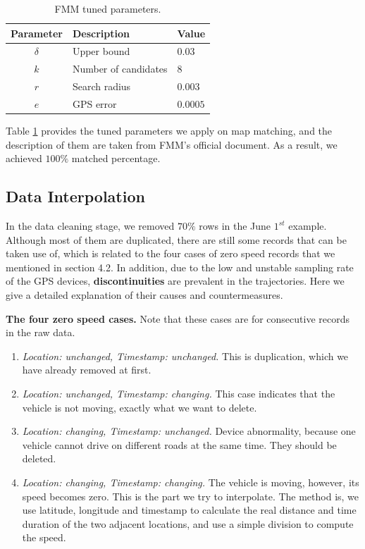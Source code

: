 \begin{table}[htb]
  \begin{center}
      \caption{FMM tuned parameters.}
      \label{fmm_table}
      \begin{tabular}{cll}
          \toprule

          \textbf{Parameter} & \textbf{Description} & \textbf{Value}\\

          \midrule

          $\delta$ & Upper bound & $0.03$\\
          $k$ & Number of candidates & $8$\\
          $r$ & Search radius & $0.003$\\
          $e$ & GPS error & $0.0005$\\

          \bottomrule
      \end{tabular}
  \end{center}
\end{table}

Table \ref{fmm_table} provides the tuned parameters we apply on map matching, and the description of them are taken from FMM's official document. As a result, we achieved $100\%$ matched percentage.

\subsection{Data Interpolation}
In the data cleaning stage, we removed $70\%$ rows in the June $1^{st}$ example. Although most of them are duplicated, there are still some records that can be taken use of, which is related to the four cases of zero speed records that we mentioned in section 4.2. In addition, due to the low and unstable sampling rate of the GPS devices, \textbf{discontinuities} are prevalent in the trajectories. Here we give a detailed explanation of their causes and countermeasures.

\vspace{\baselineskip}

\textbf{The four zero speed cases.} Note that these cases are for consecutive records in the raw data.
\begin{enumerate}
  \item \textit{Location: unchanged, Timestamp: unchanged.} This is duplication, which we have already removed at first.
  \item \textit{Location: unchanged, Timestamp: changing.} This case indicates that the vehicle is not moving, exactly what we want to delete.
  \item \textit{Location: changing, Timestamp: unchanged.} Device abnormality, because one vehicle cannot drive on different roads at the same time. They should be deleted.
  \item \textit{Location: changing, Timestamp: changing.} The vehicle is moving, however, its speed becomes zero. This is the part we try to interpolate. The method is, we use latitude, longitude and timestamp to calculate the real distance and time duration of the two adjacent locations, and use a simple division to compute the speed.
\end{enumerate}

